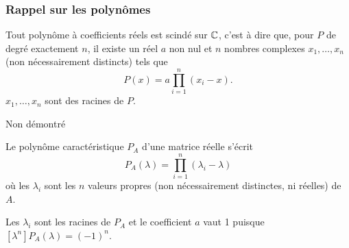 \eproof

\subsubsection{Rappel sur les polynômes} 

\begin{proposition}
  Tout polynôme à coefficients réels est scindé sur $\mathbb{C}$, c'est à dire que, pour $P$ de degré exactement $n$, il existe un réel $a$ non nul et $n$ nombres complexes $x_1, \dots, x_n$ (non nécessairement distincts) tels que
  $$
  P(x) = a \prod_{i=1}^n (x_i - x).
  $$
  $x_1, \dots, x_n$ sont des racines de $P$.
\end{proposition}

\proof
Non démontré
\eproof

\begin{corollary*}
  Le polynôme caractéristique $P_A$ d'une matrice réelle s'écrit
  $$
  P_A(\lambda) = \prod_{i=1}^n (\lambda_i - \lambda)
  $$
  où les $\lambda_i$ sont les $n$ valeurs propres (non nécessairement distinctes, ni réelles) de $A$.
\end{corollary*}

\proof
Les $\lambda_i$ sont les racines de $P_A$ et le coefficient $a$ vaut 1 puisque $[\lambda^n]P_A(\lambda) = (-1)^n$.
\eproof

